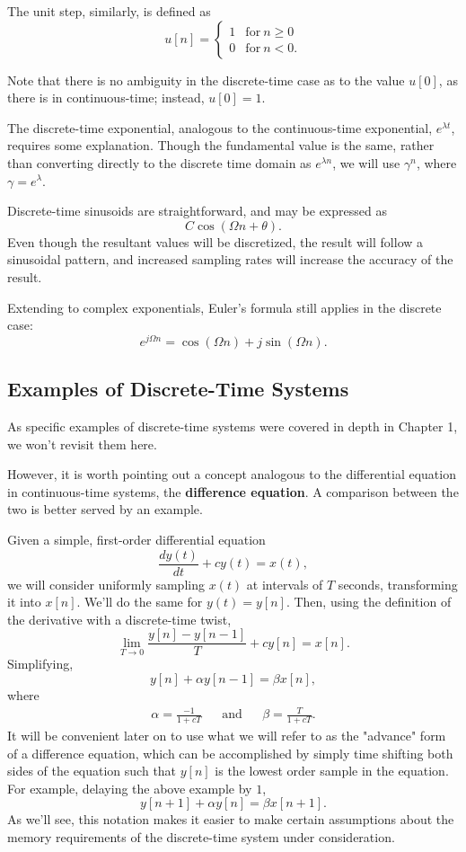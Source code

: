 \documentclass{article}
\begin{document}
The unit step, similarly, is defined as 
\[
	u[n] =
	\begin{cases}
		1 & \mathrm{for} \ n \geq 0\\
		0 & \mathrm{for} \ n < 0.
	\end{cases}
\]

Note that there is no ambiguity in the discrete-time case as to the value \(u[0]\), as there is in continuous-time; instead, \(u[0] = 1\). 

The discrete-time exponential, analogous to the continuous-time exponential, \(e^{\lambda t}\), requires some explanation. Though the fundamental value is the same, rather than converting directly to the discrete time domain as \(e^{\lambda n}\), we will use \(\gamma^n\), where \(\gamma = e^{\lambda}\). 

Discrete-time sinusoids are straightforward, and may be expressed as 
\[
	C\cos{(\Omega n + \theta)}.
\]
Even though the resultant values will be discretized, the result will follow a sinusoidal pattern, and increased sampling rates will increase the accuracy of the result.

Extending to complex exponentials, Euler's formula still applies in the discrete case:
\[
	e^{j \Omega n} = \cos{(\Omega n)} + j\sin{(\Omega n)}.
\]

\subsection{Examples of Discrete-Time Systems}

As specific examples of discrete-time systems were covered in depth in Chapter 1, we won't revisit them here. 

However, it is worth pointing out a concept analogous to the differential equation in continuous-time systems, the \textbf{difference equation}. A comparison between the two is better served by an example.

Given a simple, first-order differential equation 
\[
  \frac{dy(t)}{dt} + cy(t) = x(t),
\]
we will consider uniformly sampling \(x(t)\) at intervals of \(T\) seconds, transforming it into \(x[n].\) We'll do the same for \(y(t) = y[n]\). Then, using the definition of the derivative with a discrete-time twist, 
\[
	\lim_{T \to 0} \frac{y[n] - y[n-1]}{T}+cy[n] = x[n].
\]
Simplifying, 
\[
	y[n] + \alpha y[n-1] = \beta x[n],
\]
where 
\begin{align*}
	\alpha = \frac{-1}{1+cT} &&\mathrm{and} &&\beta = \frac{T}{1+cT}. 
\end{align*}
It will be convenient later on to use what we will refer to as the "advance" form of a difference equation, which can be accomplished by simply time shifting both sides of the equation such that \(y[n]\) is the lowest order sample in the equation. For example, delaying the above example by \(1\),
\[
	y[n+1] + \alpha y[n] = \beta x[n+1].
\]
As we'll see, this notation makes it easier to make certain assumptions about the memory requirements of the discrete-time system under consideration.
\end{document}

